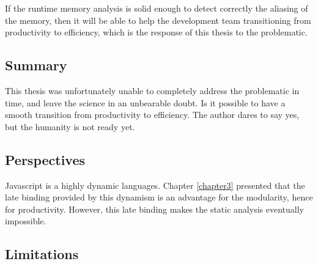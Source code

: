 If the runtime memory analysis is solid enough to detect correctly the aliasing of the memory, then it will be able to help the development team transitioning from productivity to efficiency, which is the response of this thesis to the problematic.


\subsection{Summary}

This thesis was unfortunately unable to completely address the problematic in time, and leave the science in an unbearable doubt.
Is it possible to have a smooth transition from productivity to efficiency.
The author dares to say yes, but the humanity is not ready yet.





\subsection{Perspectives}




Javascript is a highly dynamic languages.
Chapter \ref{chapter3} presented that the late binding provided by this dynamism is an advantage for the modularity, hence for productivity.
However, this late binding makes the static analysis eventually impossible.

\subsection{Limitations}

